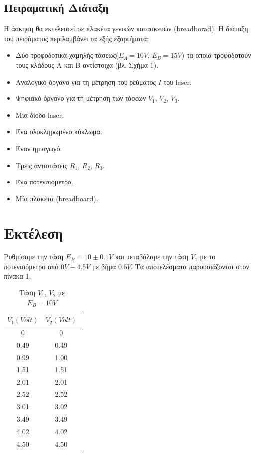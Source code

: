 \documentclass[a4paper,12pt,titlepage]{article}
\begin{document}
\subsection{Πειραματική Διάταξη}

Η άσκηση θα εκτελεστεί σε  πλακέτα γενικών κατασκευών (breadborad). H διάταξη του πειράματος περιλαμβάνει τα εξής εξαρτήματα:

\begin{itemize}
  \item Δύο τροφοδοτικά χαμηλής τάσεως($E_{A}=10V$, $E_{B}=15V$) τα οποία τροφοδοτούν τους κλάδους Α και Β αντίστοιχα (βλ. Σχήμα 1).
  \item Αναλογικό όργανο για τη μέτρηση του ρεύματος $Ι$ του laser.
  \item Ψηφιακό όργανο για τη μέτρηση των τάσεων $V_{1}$, $V_{2}$, $V_{3}$.
  \item Μία δίοδο laser.
  \item Ένα ολοκληρωμένο κύκλωμα.
  \item	Έναν ημιαγωγό.
  \item Τρεις αντιστάσεις $R_{1}$, $R_{2}$, $R_{3}$.
  \item	Ένα ποτενσιόμετρο.
  \item	Μία πλακέτα (breadboard).
\end{itemize}

\newpage

\section{Εκτέλεση}

Ρυθμίσαμε την τάση $E_{B}=10\pm{0.1}V$ και μεταβάλαμε την τάση $V_{1}$ με το ποτενσιόμετρο από $0V-4.5V$ με βήμα $0.5V$. Τα αποτελέσματα παρουσιάζονται στον πίνακα 1.

\begin{table}[h!]
\begin{center}
    \begin{tabular}{ | c | c |}
    \hline
     $V_{1} (Volt)$ & $V_{2} (Volt)$\\ \hline
     0	  &   0\\ \hline
     0.49 & 0.49\\ \hline
     0.99 & 1.00\\ \hline
     1.51 & 1.51\\ \hline
     2.01 & 2.01\\ \hline
     2.52 & 2.52\\ \hline
     3.01 & 3.02\\ \hline
     3.49 & 3.49\\ \hline
     4.02 & 4.02\\ \hline
     4.50 & 4.50\\ \hline
    \end{tabular}
\end{center}
\caption{Τάση $V_{1}$, $V_{2}$ με $E_{B}=10V$ }
\end{table}
\end{document}
